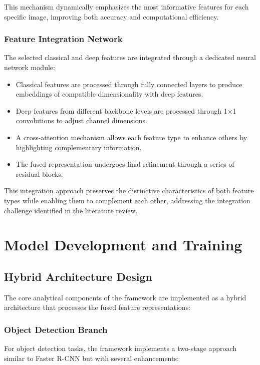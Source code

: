 This mechanism dynamically emphasizes the most informative features for each specific image, improving both accuracy and computational efficiency.

\subsubsection{Feature Integration Network}
The selected classical and deep features are integrated through a dedicated neural network module:

\begin{itemize}
    \item Classical features are processed through fully connected layers to produce embeddings of compatible dimensionality with deep features.
    
    \item Deep features from different backbone levels are processed through 1×1 convolutions to adjust channel dimensions.
    
    \item A cross-attention mechanism allows each feature type to enhance others by highlighting complementary information.
    
    \item The fused representation undergoes final refinement through a series of residual blocks.
\end{itemize}

This integration approach preserves the distinctive characteristics of both feature types while enabling them to complement each other, addressing the integration challenge identified in the literature review.

\section{Model Development and Training}

\subsection{Hybrid Architecture Design}
The core analytical components of the framework are implemented as a hybrid architecture that processes the fused feature representations:

\subsubsection{Object Detection Branch}
For object detection tasks, the framework implements a two-stage approach similar to Faster R-CNN \cite{ren2015faster} but with several enhancements:

